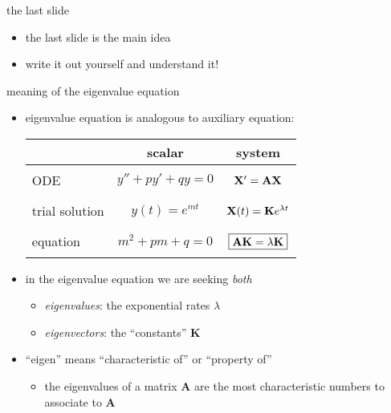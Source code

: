\documentclass[urlcolor=blue,dvipsnames]{beamer}
\newcommand{\bA}{\mathbf{A}}
\newcommand{\bK}{\mathbf{K}}
\newcommand{\bX}{\mathbf{X}}
\begin{document}
\begin{frame}{the last slide}

\begin{itemize}
\item \alert{the last slide is the main idea}
\item write it out yourself and understand it!
\end{itemize}
\end{frame}


\begin{frame}{meaning of the eigenvalue equation}

\begin{itemize}
\item eigenvalue equation is analogous to auxiliary equation:

\bigskip
\begin{tabular}{l|c|c}
               & scalar & system \\\hline
ODE            & \quad $y''+py'+qy=0$ \quad & $\bX' = \bA\bX \LARGE\strut$ \\ \hline
trial solution & $y(t) = e^{mt}$            & \quad $\bX(t) = \bK e^{\lambda t} \LARGE\strut$ \\ \hline
equation       & $m^2+pm+q=0$               & $\boxed{\bA \bK = \lambda \bK} \LARGE\strut$
\end{tabular}

\bigskip
\item in the eigenvalue equation we are seeking \emph{both}
    \begin{itemize}
    \item \emph{eigenvalues}: the exponential rates $\lambda$
    \item \emph{eigenvectors}: the ``constants'' $\bK$
    \end{itemize}

\medskip
\item ``eigen'' means ``characteristic of'' or ``property of''
    \begin{itemize}
    \item the eigenvalues of a matrix $\bA$ are the most characteristic numbers to associate to $\bA$
    \end{itemize}
\end{itemize}
\end{frame}
\end{document}
